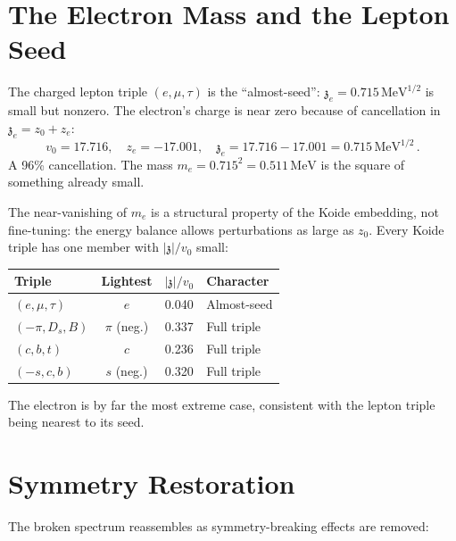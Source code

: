 \documentclass[12pt,a4paper]{article}
\newcommand{\MeV}{\,\text{MeV}}
\newcommand{\zch}{\mathfrak{z}}
\begin{document}
\section{The Electron Mass and the Lepton Seed}
\label{sec:electron}

The charged lepton triple $(e, \mu, \tau)$ is the ``almost-seed'': 
$\zch_e = 0.715\MeV^{1/2}$ is small but nonzero. The electron's 
charge is near zero because of cancellation in $\zch_e = z_0 + z_e$:
\begin{equation}
v_0 = 17.716, \quad z_e = -17.001, \quad 
\zch_e = 17.716 - 17.001 = 0.715\MeV^{1/2}\,.
\end{equation}
A 96\% cancellation. The mass $m_e = 0.715^2 = 0.511\MeV$ is the 
square of something already small.

The near-vanishing of $m_e$ is a structural property of the Koide 
embedding, not fine-tuning: the energy balance allows perturbations 
as large as $z_0$. Every Koide triple has one member with 
$|\zch|/v_0$ small:

\begin{center}
\begin{tabular}{lccl}
\toprule
Triple & Lightest & $|\zch|/v_0$ & Character \\
\midrule
$(e, \mu, \tau)$ & $e$ & 0.040 & Almost-seed \\
$(-\pi, D_s, B)$ & $\pi$ (neg.) & 0.337 & Full triple \\
$(c, b, t)$ & $c$ & 0.236 & Full triple \\
$(-s, c, b)$ & $s$ (neg.) & 0.320 & Full triple \\
\bottomrule
\end{tabular}
\end{center}

The electron is by far the most extreme case, consistent with the 
lepton triple being nearest to its seed.

\section{Symmetry Restoration}
\label{sec:restoration}

The broken spectrum reassembles as symmetry-breaking effects are 
removed:
\end{document}

